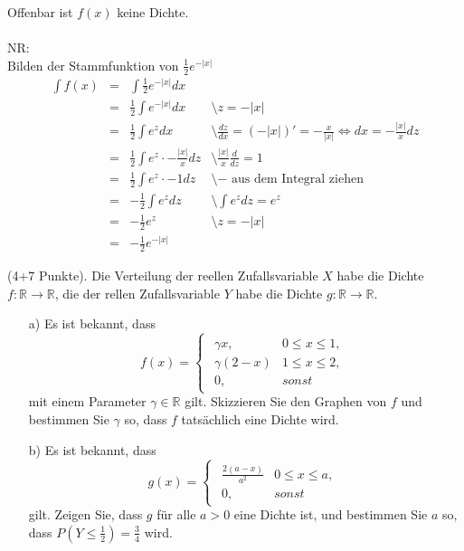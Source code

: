 \documentclass[twoside]{article}
\begin{document}
Offenbar ist $f(x)$ keine Dichte.\\
\\
NR:\\
Bilden der Stammfunktion von $\frac{1}{2}e^{-|x|}$
\[
    \begin{array}{rlll}
        \int f(x)&=&\int\frac{1}{2}e^{-|x|}dx&\\
            &=&\frac{1}{2}\int e^{-|x|}dx&\text{\textbackslash $z=-|x|$}\\
            &=&\frac{1}{2}\int e^{z}dx&\text{\textbackslash $\frac{dz}{dx}=(-|x|)'=-\frac{x}{|x|}\Leftrightarrow dx=-\frac{|x|}{x}dz$}\\
            &=&\frac{1}{2}\int e^{z}\cdot-\frac{|x|}{x}dz&\text{\textbackslash $\frac{|x|}{x}\frac{d}{dz}=1$}\\
            &=&\frac{1}{2}\int e^{z}\cdot-1dz&\text{\textbackslash $-$ aus dem Integral ziehen}\\
            &=&-\frac{1}{2}\int e^{z}dz&\text{\textbackslash $\int e^z dz = e^z$}\\
            &=&-\frac{1}{2}e^{z}&\text{\textbackslash $z=-|x|$}\\
            &=&-\frac{1}{2}e^{-|x|}
    \end{array}
\]
            
\sss

\sss


(4+7 Punkte).
Die Verteilung der reellen Zufallsvariable $X$ habe die Dichte $f: \mathbb{R} \rightarrow \mathbb{R}$, die der rellen Zufallsvariable $Y$ habe die Dichte $g: \mathbb{R} \rightarrow \mathbb{R}$.
\begin{enumerate}
	\item[a)]	Es ist bekannt, dass
				\[
					f(x) = \begin{cases}
								\begin{array}{ll}
									\gamma x,		&	0 \leq x \leq 1,\\
									\gamma (2-x)	&	1 \leq x \leq 2,\\
									0,				&	sonst
								\end{array}	
							\end{cases}
				\]
				mit einem Parameter $\gamma \in \mathbb{R}$ gilt.
				Skizzieren Sie den Graphen von $f$ und bestimmen Sie $\gamma$ so, dass $f$ tatsächlich eine Dichte wird.
	\item[b)]	Es ist bekannt, dass
				\[
					g(x) = \begin{cases}
								\begin{array}{ll}
									\frac{2(a-x)}{a^2}	&	0 \leq x \leq a,\\
									0,					&	sonst
								\end{array}	
							\end{cases}
				\]
				gilt.
				Zeigen Sie, dass $g$ für alle $a > 0$ eine Dichte ist, und bestimmen Sie $a$ so, dass $P(Y \leq \frac{1}{2}) = \frac{3}{4}$ wird.
\end{enumerate}
\end{document}
